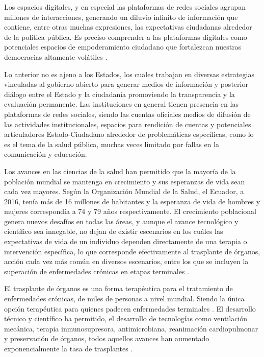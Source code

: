 \documentclass[spanish]{textolivre}
\begin{document}
Los espacios digitales, y en especial las plataformas de redes sociales agrupan millones de interacciones, generando un diluvio infinito de información \cite{levy2010} que contiene, entre otras muchas expresiones, las expectativas ciudadanas alrededor de la política pública. Es preciso comprender a las plataformas digitales como potenciales espacios de empoderamiento ciudadano que fortalezcan nuestras democracias altamente volátiles \cite{mallen2013}. 

Lo anterior no es ajeno a los Estados, los cuales trabajan en diversas estrategias vinculadas al gobierno abierto para generar medios de información y posterior diálogo entre el Estado y la ciudadanía promoviendo la transparencia y la evaluación permanente. Las instituciones en general tienen presencia en las plataformas de redes sociales, siendo las cuentas oficiales medios de difusión de las actividades institucionales, espacios para rendición de cuentas y potenciales articuladores Estado-Ciudadano alrededor de problemáticas específicas, como lo es el tema de la salud pública, muchas veces limitado por fallas en la comunicación y educación.

Los avances en las ciencias de la salud han permitido que la mayoría de la población mundial se mantenga en crecimiento y sus esperanzas de vida sean cada vez mayores. Según la Organización Mundial de la Salud, el Ecuador, a 2016, tenía más de 16 millones de habitantes y la esperanza de vida de hombres y mujeres correspondía a 74 y 79 años respectivamente. El crecimiento poblacional genera nuevos desafíos en todas las áreas, y aunque el avance tecnológico y científico sea innegable, no dejan de existir escenarios en los cuáles las expectativas de vida de un individuo dependen directamente de una terapia o intervención específica, lo que corresponde efectivamente al trasplante de órganos, acción cada vez más común en diversos escenarios, entre los que se incluyen la superación de enfermedades crónicas en etapas terminales \cite{godt, optn, unos2017}. 

El trasplante de órganos es una forma terapéutica para el tratamiento de enfermedades crónicas, de miles de personas a nivel mundial. Siendo la única opción terapéutica para quienes padecen enfermedades terminales \cite{pedroza2019}. El desarrollo técnico y científico ha permitido, el desarrollo de tecnologías como ventilación mecánica, terapia inmunosupresora, antimicrobiana, reanimación cardiopulmonar y preservación de órganos, todos aquellos avances han aumentado exponencialmente la tasa de trasplantes \cite{pedroza2019}. 
\end{document}
